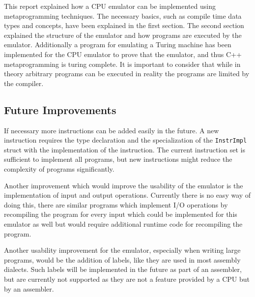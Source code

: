 
This report explained how a CPU emulator can be implemented using metaprogramming techniques.
The necessary basics, such as compile time data types and concepts, have been explained 
in the first section. The second section explained the structure of the emulator and how
programs are executed by the emulator. Additionally a program for emulating a Turing
machine has been implemented for the CPU emulator to prove that the emulator, and thus
C++ metaprogramming is turing complete. It is important to consider that while in theory
arbitrary programs can be executed in reality the programs are limited by the compiler.

\subsection{Future Improvements}
If necessary more instructions can be added easily in the future. A new instruction
requires the type declaration and the specialization of the \lstinline{InstrImpl}
struct with the implementation of the instruction. The current instruction set
is sufficient to implement all programs, but new instructions might reduce the
complexity of programs significantly.

Another improvement which would improve the usability of the emulator is the implementation
of input and output operations. Currently there is no easy way of doing this, there are
similar programs which implement I/O operations by recompiling the program for
every input \cite{iohack1} \cite{iohack2} which could be implemented for this
emulator as well but would require additional runtime code for recompiling the program.

Another usability improvement for the emulator, especially when writing large programs,
would be the addition of labels, like they are used in most assembly dialects.
Such labels will be implemented in the future as part of an assembler, but are
currently not supported as they are not a feature provided by a CPU but by an assembler.
